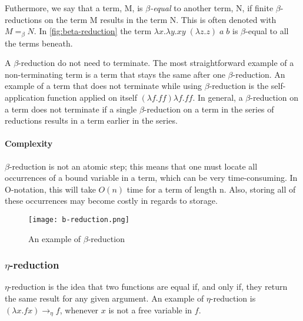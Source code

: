 \para
Futhermore, we say that a term, M, is \emph{$\beta$-equal} to another term, N, if finite $\beta$-reductions on the term M results in the term N. This is often denoted with $M =_{\beta} N$. In \autoref{fig:beta-reduction} the term $\lambda x.\lambda y. xy \; (\lambda z.z) \; a \; b$ is $\beta$-equal to all the terms beneath. 

\para
A $\beta$-reduction do not need to terminate. The most straightforward example of a non-terminating term is a term that stays the same after one $\beta$-reduction. An example of a term that does not terminate while using $\beta$-reduction is the self-application function applied on itself $(\lambda f.ff) \lambda f.ff$. In general, a $\beta$-reduction on a term does not terminate if a single $\beta$-reduction on a term in the series of reductions results in a term earlier in the series. 

\paragraph{Complexity}
$\beta$-reduction is not an atomic step; this means that one must locate all occurrences of a bound variable in a term, which can be very time-consuming. In O-notation, this will take $O(n)$ time for a term of length n. Also, storing all of these occurrences may become costly in regards to storage. 

\begin{figure}
    \centering
    \texttt{[image: b-reduction.png]}
    \caption{An example of $\beta$-reduction}
    \label{fig:beta-reduction}
\end{figure}

\subsubsection{$\eta$-reduction}
$\eta$-reduction is the idea that two functions are equal if, and only if, they return the same result for any given argument. An example of $\eta$-reduction is $(\lambda x.f x)  \rightarrow_\eta f$, whenever $x$ is not a free variable in $f$.

